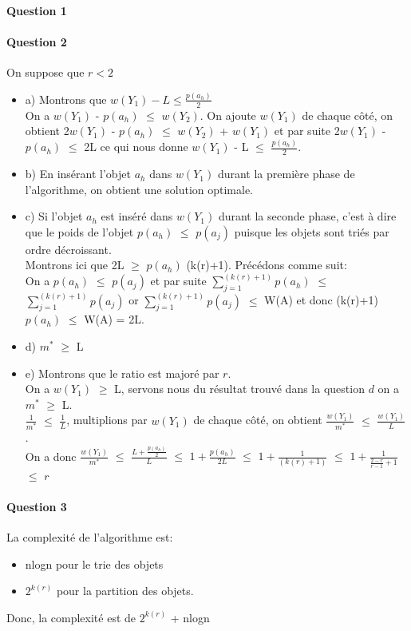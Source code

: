 \paragraph{Question 1}

\paragraph{Question 2}
On suppose que $r < 2$
\begin{itemize}
\item a) Montrons que $w(Y_{1}) - L \leqslant \frac{p(a_{h})}{2}$\\
On a $w(Y_{1})$ - $p(a_{h})$ $\leqslant$ $w(Y_{2})$. On ajoute $w(Y_{1})$ de chaque côté, on obtient 2$w(Y_{1})$ - $p(a_{h})$ $\leqslant$ $w(Y_{2})$ + $w(Y_{1})$ et par suite 2$w(Y_{1})$ - $p(a_{h})$ $\leqslant$ 2L ce qui nous donne $w(Y_{1})$ - L $\leqslant$ $\frac{p(a_{h})}{2}$.
\item b) En insérant l'objet $a_{h}$ dans $w(Y_{1})$ durant la première phase de l'algorithme, on obtient une solution optimale. 
\item c) Si l'objet $a_{h}$ est inséré dans $w(Y_{1})$ durant la seconde phase, c'est à dire que le poids de l'objet  $p(a_{h})$ $\leqslant$ $p(a_{j})$ puisque les objets sont triés par ordre décroissant.\\
Montrons ici que 2L $\geqslant$ $p(a_{h})$ (k(r)+1).
Précédons comme suit:\\
On a $p(a_{h})$ $\leqslant$ $p(a_{j})$ et par suite $\sum_{j=1}^{(k(r)+1)} p(a_{h})$ $\leqslant$ $\sum_{j=1}^{(k(r)+1)} p(a_{j})$ or $\sum_{j=1}^{(k(r)+1)} p(a_{j})$ $\leqslant$ W(A) et donc (k(r)+1)$p(a_{h})$ $\leqslant$ W(A) = 2L. 
\item d) $m^{*}$ $\geqslant$ L
\item e) Montrons que le ratio est majoré par $r$.\\
On a $w(Y_{1})$ $\geqslant$ L, servons nous du résultat trouvé dans la question $d$ on a $m^{*}$ $\geqslant$ L.\\
$\frac{1}{m^{*}}$ $\leqslant$ $\frac{1}{L}$, multiplions par $w(Y_{1})$ de chaque côté, on obtient $\frac{w(Y_{1})}{m^{*}}$ $\leqslant$ $\frac{w(Y_{1})}{L}$.\\
On a donc $\frac{w(Y_{1})}{m^{*}}$ $\leqslant$ $\frac {L + \frac {p(a_{h})}{2}}{L}$ $\leqslant$ $1 + \frac{p(a_{h})}{2L}$ $\leqslant$ $1 + \frac{1}{(k(r)+1)}$ $\leqslant$ $1 + \frac{1}{\frac{2-r}{r-1}+1}$ $\leqslant$ $r$
\end{itemize}
\paragraph{Question 3}
La complexité de l'algorithme est: 
\begin{itemize}
\item nlogn pour le trie des objets 
\item $2^{k(r)}$ pour la partition des objets.
\end{itemize}
Donc, la complexité est de $2^{k(r)}$ +  nlogn
